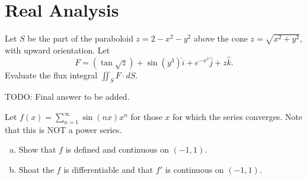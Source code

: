 \section{Real Analysis}
\begin{problem}
	Let $ S $ be the part of the paraboloid $ z = 2 - x^2 - y^2 $ above the cone $ z = \sqrt{x^2+y^2} $, with upward orientation. Let
	\[ F = (\tan\sqrt{z}) + \sin(y^3) \hat{i} + e^{-x^2} \hat{j} + z \hat{k}. \]
	Evaluate the flux integral $ \iint_S F\cdot dS.\ $
\end{problem}
\begin{solution}
	{\color{red} \noindent TODO: Final answer to be added.}
\end{solution}


\begin{problem}
	Let $ f(x) = \sum_{n=1}^{\infty}\sin(nx)x^n$ for those $ x $ for which the series converges. Note that this is NOT a power series. 
	\begin{enumerate}[(a)]
		\item Show that $ f $ is defined and continuous on $ (-1,1) $.
		\item Shoat the $ f $ is differentiable and that $ f' $ is continuous on $ (-1,1) $.
	\end{enumerate}
\end{problem}
